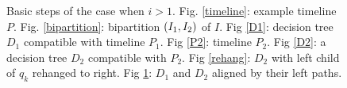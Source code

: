 \begin{figure}[htp]
\begin{minipage}[t]{0.4\textwidth}
    \caption{}\label{D}
\end{minipage}
\caption{Basic steps of the case when $i>1$. Fig. \ref{timeline}: example timeline $P$. Fig. \ref{bipartition}: bipartition $\mathopen{}\left( I_1,I_2 \right)$ of $I$. Fig \ref{D1}: decision tree $D_1$ compatible with timeline $P_1$. Fig \ref{P2}: timeline $P_2$. Fig \ref{D2}: a decision tree $D_2$ compatible with $P_2$. Fig \ref{rehang}: $D_2$ with left child of $q_k$ rehanged to right. Fig \ref{D}: $D_1$ and $D_2$ aligned by their left paths.}
\end{figure}